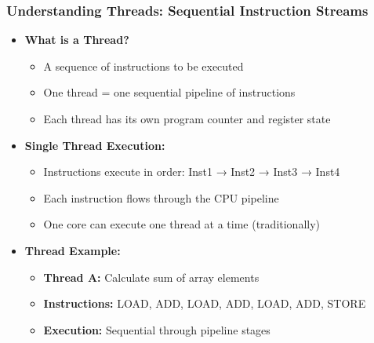 \begin{frame}
\frametitle{Understanding Threads: Sequential Instruction Streams}
\begin{itemize}
    \item \textbf{What is a Thread?}
    \begin{itemize}
        \item A sequence of instructions to be executed
        \item One thread = one sequential pipeline of instructions
        \item Each thread has its own program counter and register state
    \end{itemize}
    \item \textbf{Single Thread Execution:}
    \begin{itemize}
        \item Instructions execute in order: Inst1 → Inst2 → Inst3 → Inst4
        \item Each instruction flows through the CPU pipeline
        \item One core can execute one thread at a time (traditionally)
    \end{itemize}
    \item \textbf{Thread Example:}
    \begin{itemize}
        \item \textbf{Thread A:} Calculate sum of array elements
        \item \textbf{Instructions:} LOAD, ADD, LOAD, ADD, LOAD, ADD, STORE
        \item \textbf{Execution:} Sequential through pipeline stages
    \end{itemize}
\end{itemize}
\end{frame}

